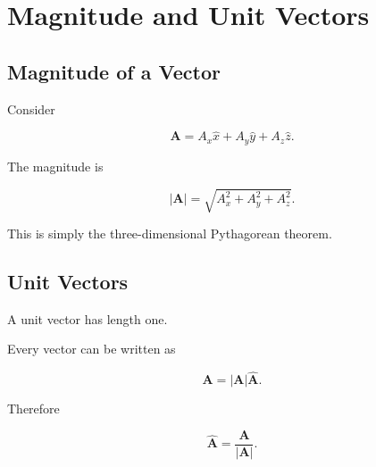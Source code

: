 \section{Magnitude and Unit Vectors}
\label{sec:magnitude-unit}

\subsection{Magnitude of a Vector}

Consider

\[
\mathbf A=
A_x\hat x
+
A_y\hat y
+
A_z\hat z.
\]

The magnitude is

\[
|\mathbf A|
=
\sqrt{
	A_x^2
	+
	A_y^2
	+
	A_z^2
}.
\]

This is simply the three-dimensional Pythagorean theorem.


\subsection{Unit Vectors}

A unit vector has length one.

Every vector can be written as

\[
\mathbf A
=
|\mathbf A|
\hat{\mathbf A}.
\]

Therefore

\[
\hat{\mathbf A}
=
\frac{\mathbf A}{|\mathbf A|}.
\]

